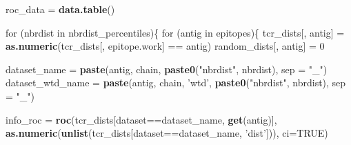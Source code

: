 \documentclass[]{article}
\newenvironment{Shaded}{\begin{snugshade}}{\end{snugshade}}
\newcommand{\KeywordTok}[1]{\textcolor[rgb]{0.13,0.29,0.53}{\textbf{{#1}}}}
\newcommand{\DataTypeTok}[1]{\textcolor[rgb]{0.13,0.29,0.53}{{#1}}}
\newcommand{\DecValTok}[1]{\textcolor[rgb]{0.00,0.00,0.81}{{#1}}}
\newcommand{\StringTok}[1]{\textcolor[rgb]{0.31,0.60,0.02}{{#1}}}
\newcommand{\OtherTok}[1]{\textcolor[rgb]{0.56,0.35,0.01}{{#1}}}
\newcommand{\NormalTok}[1]{{#1}}
\begin{document}
\begin{Shaded}
\begin{Highlighting}[]
\NormalTok{roc_data =}\StringTok{ }\KeywordTok{data.table}\NormalTok{()}


\NormalTok{for (nbrdist in nbrdist_percentiles)\{}
  \NormalTok{for (antig in epitopes)\{}
    \NormalTok{tcr_dists[, antig] =}\StringTok{ }\KeywordTok{as.numeric}\NormalTok{(tcr_dists[, epitope.work] ==}\StringTok{ }\NormalTok{antig)}
    \NormalTok{random_dists[, antig] =}\StringTok{ }\DecValTok{0}
    
    \NormalTok{dataset_name =}\StringTok{ }\KeywordTok{paste}\NormalTok{(antig, chain, }\KeywordTok{paste0}\NormalTok{(}\StringTok{"nbrdist"}\NormalTok{, nbrdist), }\DataTypeTok{sep =} \StringTok{"_"}\NormalTok{)}
    \NormalTok{dataset_wtd_name =}\StringTok{ }\KeywordTok{paste}\NormalTok{(antig, chain, }\StringTok{'wtd'}\NormalTok{, }\KeywordTok{paste0}\NormalTok{(}\StringTok{"nbrdist"}\NormalTok{, nbrdist), }\DataTypeTok{sep =} \StringTok{"_"}\NormalTok{)}
    
    \NormalTok{info_roc =}\StringTok{ }\KeywordTok{roc}\NormalTok{(tcr_dists[dataset==dataset_name, }\KeywordTok{get}\NormalTok{(antig)],}
                   \KeywordTok{as.numeric}\NormalTok{(}\KeywordTok{unlist}\NormalTok{(tcr_dists[dataset==dataset_name, }
                                               \StringTok{'dist'}\NormalTok{])), }\DataTypeTok{ci=}\OtherTok{TRUE}\NormalTok{)}
    

\end{Highlighting}
\end{Shaded}
\end{document}
